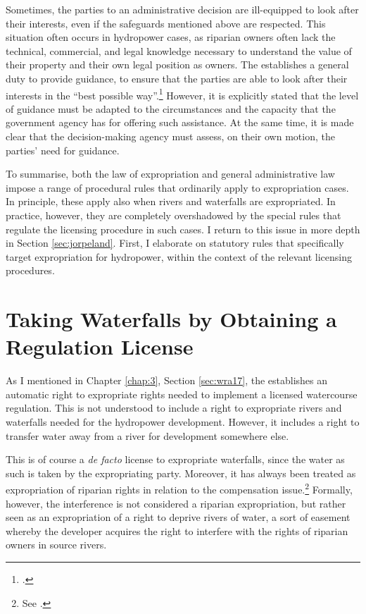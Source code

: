 Sometimes, the parties to an administrative decision are ill-equipped to look after their interests, even if the safeguards mentioned above are respected. This situation often occurs in hydropower cases, as riparian owners often lack the technical, commercial, and legal knowledge necessary to understand the value of their property and their own legal position as owners. The \cite{paa67} establishes a general duty to provide guidance, to ensure that the parties are able to look after their interests in the ``best possible way''.\footcite[11]{paa67} However, it is explicitly stated that the level of guidance must be adapted to the circumstances and the capacity that the government agency has for offering such assistance. At the same time, it is made clear that the decision-making agency must assess, on their own motion, the parties' need for guidance.

To summarise, both the law of expropriation and general administrative law impose a range of procedural rules that ordinarily apply to expropriation cases. In principle, these apply also when rivers and waterfalls are expropriated. In practice, however, they are completely overshadowed by the special rules that regulate the licensing procedure in such cases. I return to this issue in more depth in Section \ref{sec:jorpeland}. First, I elaborate on statutory rules that specifically target expropriation for hydropower, within the context of the relevant licensing procedures.

\section{Taking Waterfalls by Obtaining a Regulation License}\label{sec:special}

As I mentioned in Chapter \ref{chap:3}, Section \ref{sec:wra17}, the \cite{wra17} establishes an automatic right to expropriate rights needed to implement a licensed watercourse regulation. This is not understood to include a right to expropriate rivers and waterfalls needed for the hydropower development. However, it includes a right to transfer water away from a river for development somewhere else. 

This is of course a {\it de facto} license to expropriate waterfalls, since the water as such is taken by the expropriating party. Moreover, it has always been treated as expropriation of riparian rights in relation to the compensation issue.\footnote{See \cite{jorpeland11}.} Formally, however, the interference is not considered a riparian expropriation, but rather seen as an expropriation of a right to deprive rivers of water, a sort of easement whereby the developer acquires the right to interfere with the rights of riparian owners in source rivers.

